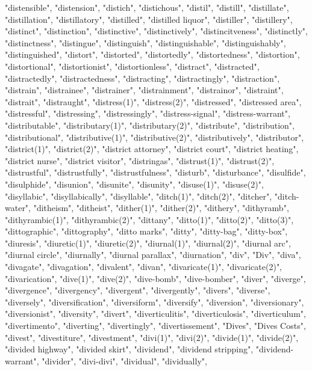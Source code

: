 "distensible",
"distension",
"distich",
"distichous",
"distil",
"distill",
"distillate",
"distillation",
"distillatory",
"distilled",
"distilled liquor",
"distiller",
"distillery",
"distinct",
"distinction",
"distinctive",
"distinctively",
"distincitveness",
"distinctly",
"distinctness",
"distingue",
"distinguish",
"distinguishable",
"distinguishably",
"distinguished",
"distort",
"distorted",
"distortedly",
"distortedness",
"distortion",
"distortional",
"distortionist",
"distortionless",
"distract",
"distracted",
"distractedly",
"distractedness",
"distracting",
"distractingly",
"distraction",
"distrain",
"distrainee",
"distrainer",
"distrainment",
"distrainor",
"distraint",
"distrait",
"distraught",
"distress(1)",
"distress(2)",
"distressed",
"distressed area",
"distressful",
"distressing",
"distressingly",
"distress-signal",
"distress-warrant",
"distributable",
"distributary(1)",
"distributary(2)",
"distribute",
"distribution",
"distributional",
"distributive(1)",
"distributive(2)",
"distributively",
"distributor",
"district(1)",
"district(2)",
"district attorney",
"district court",
"district heating",
"district nurse",
"district visitor",
"distringas",
"distrust(1)",
"distrust(2)",
"distrustful",
"distrustfully",
"distrustfulness",
"disturb",
"disturbance",
"disulfide",
"disulphide",
"disunion",
"disunite",
"disunity",
"disuse(1)",
"disuse(2)",
"disyllabic",
"disyllabically",
"disyllable",
"ditch(1)",
"ditch(2)",
"ditcher",
"ditch-water",
"ditheism",
"ditheist",
"dither(1)",
"dither(2)",
"dithery",
"dithyramb",
"dithyrambic(1)",
"dithyrambic(2)",
"dittany",
"ditto(1)",
"ditto(2)",
"ditto(3)",
"dittographic",
"dittography",
"ditto marks",
"ditty",
"ditty-bag",
"ditty-box",
"diuresis",
"diuretic(1)",
"diuretic(2)",
"diurnal(1)",
"diurnal(2)",
"diurnal arc",
"diurnal circle",
"diurnally",
"diurnal parallax",
"diurnation",
"div",
"Div",
"diva",
"divagate",
"divagation",
"divalent",
"divan",
"divaricate(1)",
"divaricate(2)",
"divarication",
"dive(1)",
"dive(2)",
"dive-bomb",
"dive-bomber",
"diver",
"diverge",
"divergence",
"divergency",
"divergent",
"divergently",
"divers",
"diverse",
"diversely",
"diversification",
"diversiform",
"diversify",
"diversion",
"diversionary",
"diversionist",
"diversity",
"divert",
"diverticulitis",
"diverticulosis",
"diverticulum",
"divertimento",
"diverting",
"divertingly",
"divertissement",
"Dives",
"Dives Costs",
"divest",
"divestiture",
"divestment",
"divi(1)",
"divi(2)",
"divide(1)",
"divide(2)",
"divided highway",
"divided skirt",
"dividend",
"dividend stripping",
"dividend-warrant",
"divider",
"divi-divi",
"dividual",
"dividually",
